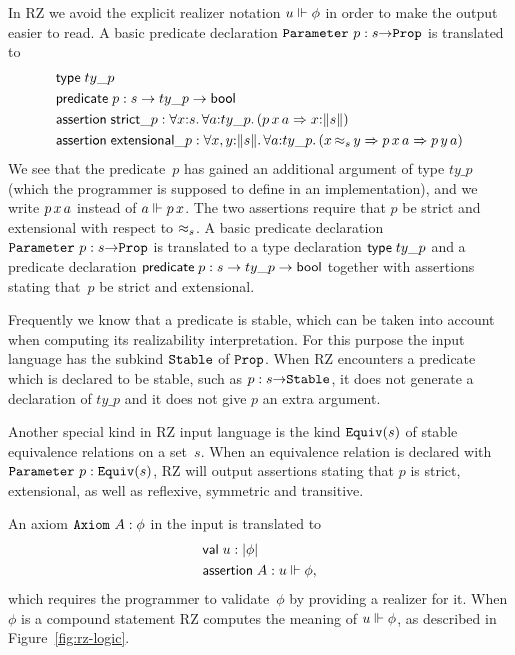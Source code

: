 In RZ we avoid the explicit realizer notation $u \Vdash \phi$ in order to
make the output easier to read.
%
\iflong
%
A basic predicate declaration $\mathtt{Parameter}\ p : s{\to}\mathtt{Prop}$ is
translated to
%
\begin{align*}
  & \otyspec{ty\_p} \\
  & \opropspec{p}{s \to ty\_p \to \oProp} \\
  & \oassertion{\mathsf{strict}\_p}{
    \oforall{x}{s}{
      \oforall{a}{ty\_p}{
        (\oimply
        {\oapp{\oapp{p}{x}}{a}}
        {\ototal{x}{s}
        })
      }
    }
  } \\
  & \oassertion{\mathsf{extensional}\_p}{
    \oforallt{x,y}{s}{
      \oforall{a}{ty\_p}{
          (\oimply{\oper{s}{x}{y}}
          {\oimply{\oapp{\oapp{p}{x}}{a}}{\oapp{\oapp{p}{y}}{a}}})
          }}}
\end{align*}
%
We see that the predicate~$p$ has gained an additional argument of
type $ty\_p$ (which the programmer is supposed to define in an
implementation), and we write $p\,x\,a$ instead of $a
\Vdash p\,x$. The two assertions require that $p$ be strict and
extensional with respect to $\approx_s$.
%
\else %
%
A basic predicate declaration $\mathtt{Parameter}\ p : s{\to}\mathtt{Prop}$ is
translated to a type declaration $\mathsf{type}\;ty\_p$ and a predicate
declaration $\mathsf{predicate}\; p:s \to ty\_p \to \mathsf{bool}$ together with
assertions stating that~$p$ be strict and extensional.
%
\fi %

Frequently we know that a predicate is stable, which can be taken into
account when computing its realizability interpretation. For this
purpose the input language has the subkind $\mathtt{Stable}$ of $\mathtt{Prop}$.
When RZ encounters a predicate which is declared to be stable, such as
$p : s{\to}\mathtt{Stable}$, it does not generate a declaration of
$ty\_p$ and it does not give $p$ an extra argument.

Another special kind in RZ input language is the kind $\mathtt{Equiv}(s)$ of
stable equivalence relations on a set~$s$. When an equivalence
relation is declared with $\mathtt{Parameter}\ p : \mathtt{Equiv}(s)$, RZ will output
assertions stating that $p$ is strict, extensional, as well as
reflexive, symmetric and transitive.

An axiom $\mathtt{Axiom}\ A : \phi$ in the input is translated to
%
\begin{align*}
  & \mathsf{val}\;u:|\phi| \\
  & \mathsf{assertion}\; A : u \Vdash \phi,
\end{align*}
%
which requires the programmer to validate~$\phi$ by providing a
realizer for it. When $\phi$ is a compound statement RZ computes the
meaning of $u \Vdash \phi$, as described in Figure~\ref{fig:rz-logic}.




